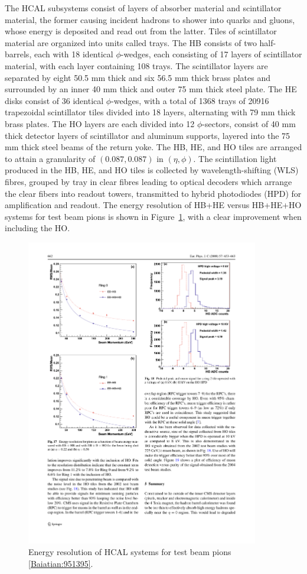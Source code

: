 \indent The HCAL subsystems consist of layers of absorber material and scintillator material, the former causing incident hadrons to shower into quarks and gluons, whose energy is deposited and read out from the latter. Tiles of scintillator material are organized into units called trays. The HB consists of two half-barrels, each with 18 identical $\phi$-wedges, each consisting of 17 layers of scintillator material, with each layer containing 108 trays. The scintillator layers are separated by eight 50.5 mm thick and six 56.5 mm thick brass plates and surrounded by an inner 40 mm thick and outer 75 mm thick steel plate. The HE disks consist of 36 identical $\phi$-wedges, with a total of 1368 trays of 20916 trapezoidal scintillator tiles divided into 18 layers, alternating with 79 mm thick brass plates. The HO layers are each divided into 12 $\phi$-sectors, consist of 40 mm thick detector layers of scintillator and aluminum supports, layered into the 75 mm thick steel beams of the return yoke. The HB, HE, and HO tiles are arranged to attain a granularity of $(0.087, 0.087)$ in $(\eta, \phi)$. The scintillation light produced in the HB, HE, and HO tiles is collected by wavelength-shifting (WLS) fibres, grouped by tray in clear fibres leading to optical decoders which arrange the clear fibers into readout towers, transmitted to hybrid photodiodes (HPD) for amplification and readout. The energy resolution of HB+HE versus HB+HE+HO systems for test beam pions is shown in Figure~\ref{fig:eres_hcal}, with a clear improvement when including the HO.

\begin{figure}[tbh]
\centering
\includegraphics[width=4in]{figures/eres_hcal.pdf}
\caption{Energy resolution of HCAL systems for test beam pions \ref{Baiatian:951395}.}
\label{fig:eres_hcal}
\end{figure}

